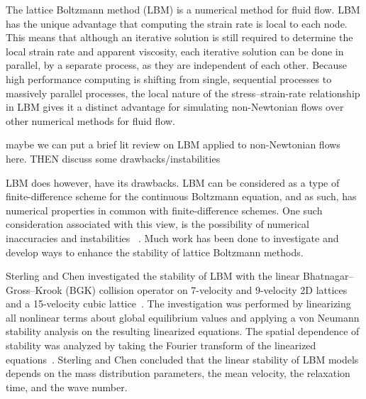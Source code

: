 \documentclass{article}
\begin{document}
The lattice Boltzmann method (LBM) is a numerical method for fluid flow.
LBM has the unique advantage that computing the strain rate is local to each node.
This means that although an iterative solution is still required to determine the local strain rate and apparent viscosity, each iterative solution can be done in parallel, by a separate process, as they are independent of each other.
Because high performance computing is shifting from single, sequential processes to massively parallel processes, the local nature of the stress--strain-rate relationship in LBM gives it a distinct advantage for simulating non-Newtonian flows over other numerical methods for fluid flow. %

{\color{red} maybe we can put a brief lit review on LBM applied to non-Newtonian flows here. THEN discuss some drawbacks/instabilities}



LBM does however, have its drawbacks.
LBM can be considered as a type of finite-difference scheme for the continuous Boltzmann equation, and as such, has numerical properties in common with finite-difference schemes. %
One such consideration associated with this view, is the possibility of numerical inaccuracies and instabilities ~\cite{sterling1993stability,sterling1996stability,bawazeer2013stability,lallemand2000theory}. %
Much work has been done to investigate and develop ways to enhance the stability of lattice Boltzmann methods.

Sterling and Chen investigated the stability of LBM with the linear Bhatnagar--Gross--Krook (BGK) collision operator on 7-velocity and 9-velocity 2D lattices and a 15-velocity cubic lattice~\cite{sterling1993stability,sterling1996stability}.
The investigation was performed by linearizing all nonlinear terms about global equilibrium values and applying a von Neumann stability analysis on the resulting linearized equations.
The spatial dependence of stability was analyzed by taking the Fourier transform of the linearized equations~\cite{sterling1993stability}.
Sterling and Chen concluded that the linear stability of LBM models depends on the mass distribution parameters, the mean velocity, the relaxation time, and the wave number. %
\end{document}
